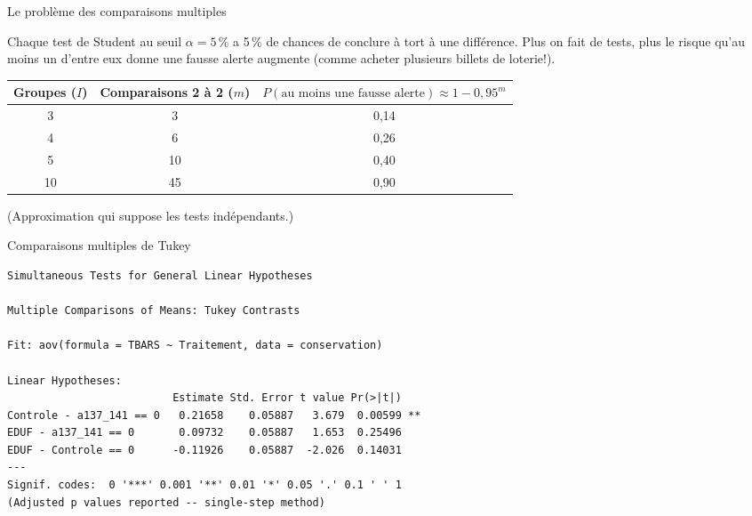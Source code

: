\documentclass{BeamerTemplate}
\begin{document}
\begin{frame}[t]{Le problème des comparaisons multiples}

\small
Chaque test de Student au seuil $\alpha=5\,\%$ a 5\,\% de chances de conclure à
tort à une différence. Plus on fait de tests, plus le risque qu'\alert{au moins un}
d'entre eux donne une fausse alerte augmente (comme acheter plusieurs billets de
loterie!).

\begin{center}
\scriptsize
\renewcommand{\arraystretch}{1.1}
\begin{tabular}{ccc}
\toprule
Groupes ($I$) & Comparaisons 2 à 2 ($m$) & $P(\text{au moins une fausse alerte})\approx 1-0{,}95^{m}$\\
\midrule
3  & 3  & 0,14\\
4  & 6  & 0,26\\
5  & 10 & 0,40\\
10 & 45 & 0,90\\
\bottomrule
\end{tabular}

{\tiny (Approximation qui suppose les tests indépendants.)}
\end{center}

\vspace{-4mm}

\end{frame}

\begin{frame}[fragile,t]{Comparaisons multiples de Tukey}

\begin{Verbatim}[fontsize=\scriptsize]
         Simultaneous Tests for General Linear Hypotheses

Multiple Comparisons of Means: Tukey Contrasts

Fit: aov(formula = TBARS ~ Traitement, data = conservation)

Linear Hypotheses:
                          Estimate Std. Error t value Pr(>|t|)
Controle - a137_141 == 0   0.21658    0.05887   3.679  0.00599 **
EDUF - a137_141 == 0       0.09732    0.05887   1.653  0.25496
EDUF - Controle == 0      -0.11926    0.05887  -2.026  0.14031
---
Signif. codes:  0 '***' 0.001 '**' 0.01 '*' 0.05 '.' 0.1 ' ' 1
(Adjusted p values reported -- single-step method)
\end{Verbatim}

\end{frame}
\end{document}
